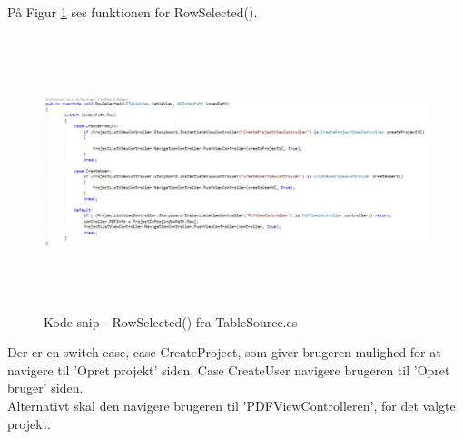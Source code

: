På Figur \ref{fig:RowSelection} ses funktionen for RowSelected().
\begin{figure}[H] %
	\centering
	\includegraphics[height=8cm, width=17cm]{../ArkitekturDesign/Design/ProjectList/RowSelection}
	\caption{Kode snip - RowSelected() fra TableSource.cs}
	\label{fig:RowSelection}
\end{figure}
Der er en switch case, case CreateProject, som giver brugeren mulighed for at navigere til 'Opret projekt' siden. Case CreateUser navigere brugeren til 'Opret bruger' siden. \\
Alternativt skal den navigere brugeren til 'PDFViewControlleren', for det valgte projekt.

\clearpage
